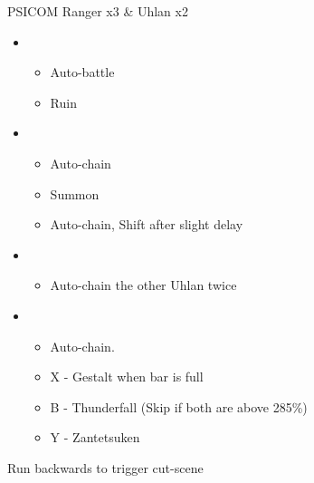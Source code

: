 \begin{paracol}{2}
	\begin{battle}{PSICOM Ranger x3 \& Uhlan x2}
		\begin{itemize}
			\item \second
			      \begin{itemize}
				      \item Auto-battle
				      \item Ruin
			      \end{itemize}
			\item \fourth
			      \begin{itemize}
				      \item Auto-chain
				      \item Summon
				      \item Auto-chain, Shift after slight delay
			      \end{itemize}
			\item \fifth
			      \begin{itemize}
				      \item Auto-chain the other Uhlan twice
			      \end{itemize}
			\item \fourth
			      \begin{itemize}
				      \item Auto-chain.
				      \item X - Gestalt when bar is full
				      \item B - Thunderfall (Skip if both are above 285\%)
				      \item Y - Zantetsuken
			      \end{itemize}
		\end{itemize}
		 
	\end{battle}
	\switchcolumn
	Run backwards to trigger cut-scene


\end{paracol}
